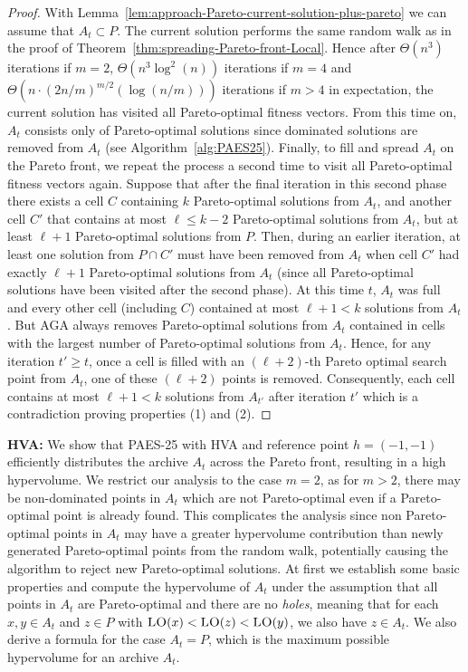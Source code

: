 \documentclass[
sigconf = false, %
review = false, %
screen = true, %
anonymous = true, %
format=acmsmall
]{acmart}
\newcommand{\LO}{\textsc{LO}\xspace}                      %
\newcommand{\PAES}{PAES-25\xspace}
\begin{document}
\begin{proof}
With Lemma~\ref{lem:approach-Pareto-current-solution-plus-pareto} we can assume that $A_t \subset P$. The current solution performs the same random walk as in the proof of Theorem~\ref{thm:spreading-Pareto-front-Local}. Hence after $\Theta(n^3)$ iterations if $m=2$, $\Theta(n^3\log^2(n))$ iterations if $m = 4$ and $\Theta(n \cdot (2n/m)^{m/2}(\log(n/m)))$ iterations if $m>4$ in expectation, the current solution has visited all Pareto-optimal fitness vectors. From this time on, $A_t$ consists only of Pareto-optimal solutions since dominated solutions are removed from $A_t$ (see Algorithm~\ref{alg:PAES25}). Finally, to fill and spread $A_t$ on the Pareto front, we repeat the process a second time to visit all Pareto-optimal fitness vectors again. Suppose that after the final iteration in this second phase there exists a cell $C$ containing $k$ Pareto-optimal solutions from $A_t$, and another cell $C'$ that contains at most $\ell \leq k-2$ Pareto-optimal solutions from $A_t$, but at least $\ell+1$ Pareto-optimal solutions from $P$. Then, during an earlier iteration, at least one solution from $P \cap C'$ must have been removed from $A_t$ when cell $C'$ had exactly $\ell + 1$ Pareto-optimal solutions from $A_t$ (since all Pareto-optimal solutions have been visited after the second phase). At this time $t$, $A_t$ was full and every other cell (including $C$) contained at most $\ell +1<k$ solutions from $A_t$. But AGA always removes Pareto-optimal solutions from $A_t$ contained in cells with the largest number of Pareto-optimal solutions from $A_t$. Hence, for any iteration $t' \geq t$, once a cell is filled with an $(\ell+2)$-th Pareto optimal search point from $A_t$, one of these $(\ell+2)$ points is removed. Consequently, each cell contains at most $\ell + 1 < k$ solutions from $A_{t'}$ after iteration $t'$ which is a contradiction proving properties (1) and (2).      
\end{proof}
\textbf{HVA:} We show that \PAES with HVA and reference point $h=(-1,-1)$ efficiently distributes the archive $A_t$ across the Pareto front, resulting in a high hypervolume. We restrict our analysis to the case $m=2$, as for $m > 2$, there may be non-dominated points in $A_t$ which are not Pareto-optimal even if a Pareto-optimal point is already found. This complicates the analysis since non Pareto-optimal points in $A_t$ may have a greater hypervolume contribution than newly generated Pareto-optimal points from the random walk, potentially causing the algorithm to reject new Pareto-optimal solutions. At first we establish some basic properties and compute the hypervolume of $A_t$ under the assumption that all points in $A_t$ are Pareto-optimal and there are no \emph{holes}, meaning that for each $x,y \in A_t$ and $z \in P$ with $\LO(x) < \LO(z) < \LO(y)$, we also have $z \in A_t$. We also derive a formula for the case $A_t=P$, which is the maximum possible hypervolume for an archive $A_t$. 
\end{document}
